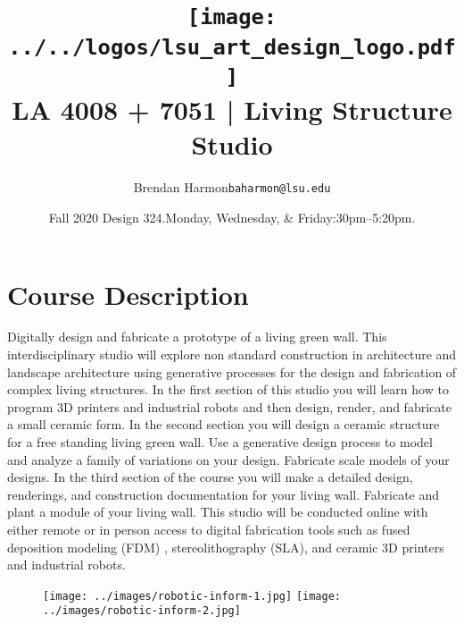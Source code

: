 \documentclass[11pt,article,oneside]{memoir}
\makeatletter
\def\myauthor{Author}
\def\mytitle{Title}
\def\myemail{baharmon@lsu.edu}
\def\myauthor{Brendan Harmon}
\def\mytitle{ \texttt{[image: ../../logos/lsu\_art\_design\_logo.pdf]} \\[0.1cm] {\normalfont \normalsize LA 4008 + 7051 |} \Large Living Structure Studio}
\newcommand{\globalcolor}[1]{%
  \color{#1}\global\let\default@color\current@color
}
\makeatother
\begin{document}
\setlength\bibitemsep{0.5em}

\setmainfont[Scale=1, Path = ../../fonts/lato/,BoldItalicFont=Lato-RegIta,BoldFont=Lato-Reg,ItalicFont=Lato-LigIta]{Lato-Lig}
\setsansfont[Scale=1, Path = ../../fonts/lato/,BoldItalicFont=Lato-RegIta,BoldFont=Lato-Reg,ItalicFont=Lato-LigIta]{Lato-Lig}
\setmonofont[Mapping=tex-text,Scale=0.8,Path = ../../fonts/inconsolata/]{i}
\newfontfamily{}

\def\ind{\hangindent=1 true cm\hangafter=1 \noindent}
\def\labelitemi{$\cdot$}

\title{\LARGE \mytitle}
\author{\Large\myauthor \newline \footnotesize\texttt{\noindent\myemail}}
\date{Fall 2020 Design 324.\newline Monday, Wednesday, \& Friday:30pm--5:20pm.}
\published{\,}


\globalcolor{black}
\vspace*{-10em}
\maketitle

\section{Course Description}

Digitally design and fabricate a prototype of a living green wall. 
This interdisciplinary studio will explore 
non standard construction 
in architecture and landscape architecture
using generative processes 
for the design and fabrication 
of complex living structures. 
In the first section of this studio you will 
learn how to program 3D printers and industrial robots 
and then design, render, and fabricate 
a small ceramic form.  
In the second section you will design 
a ceramic structure for a free standing living green wall.
Use a generative design process to model 
and analyze a family of variations on your design.
Fabricate scale models of your designs.  
In the third section of the course 
you will make a detailed design, renderings,  
and construction documentation
for your living wall. 
Fabricate and plant a module of your living wall.
This studio will be conducted online 
with either remote or in person access 
to digital fabrication tools such as 
fused deposition modeling (FDM) ,
stereolithography (SLA), and
ceramic 3D printers
and industrial robots. \\

\begin{figure}[h!]
\center
\texttt{[image: ../images/robotic-inform-1.jpg]}
\texttt{[image: ../images/robotic-inform-2.jpg]}
\end{figure}
\end{document}
